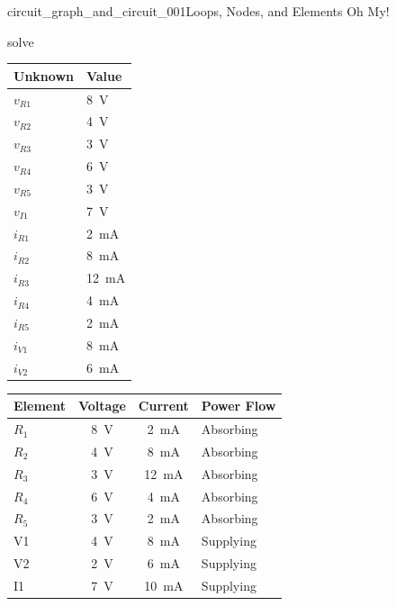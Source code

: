 \begin{mainquestion}{circuit_graph_and_circuit_001}{Loops, Nodes, and Elements Oh My!}
\begin{partquestion}{solve}
\begin{answer}
\begin{table}[htbp]
\begin{minipage}[t]{0.37\textwidth}
\centering
\begin{tabular}{|l|l|}
\hline
Unknown & Value \\ \hline
$v_{R1}$ & \qty{8}{\volt} \\ \hline
$v_{R2}$ & \qty{4}{\volt} \\ \hline
$v_{R3}$ & \qty{3}{\volt} \\ \hline
$v_{R4}$ & \qty{6}{\volt} \\ \hline
$v_{R5}$ & \qty{3}{\volt} \\ \hline
$v_{I1}$ & \qty{7}{\volt} \\ \hline
$i_{R1}$ & \qty{2}{\milli\ampere} \\ \hline
$i_{R2}$ & \qty{8}{\milli\ampere} \\ \hline
$i_{R3}$ & \qty{12}{\milli\ampere} \\ \hline
$i_{R4}$ & \qty{4}{\milli\ampere} \\ \hline
$i_{R5}$ & \qty{2}{\milli\ampere} \\ \hline
$i_{V1}$ & \qty{8}{\milli\ampere} \\ \hline
$i_{V2}$ & \qty{6}{\milli\ampere} \\ \hline
\end{tabular}
\end{minipage}
\hfill
\begin{minipage}[t]{0.60\textwidth}
\centering
\begin{tabular}{|l|c|c|l|}
\hline
Element & Voltage & Current & Power Flow \\ \hline
$R_1$ & \qty{8}{\volt} & \qty{2}{\milli\ampere} & Absorbing \\ \hline
$R_2$ & \qty{4}{\volt} & \qty{8}{\milli\ampere} & Absorbing \\ \hline
$R_3$ & \qty{3}{\volt} & \qty{12}{\milli\ampere} & Absorbing \\ \hline
$R_4$ & \qty{6}{\volt} & \qty{4}{\milli\ampere} & Absorbing \\ \hline
$R_5$ & \qty{3}{\volt} & \qty{2}{\milli\ampere} & Absorbing \\ \hline
V1 & \qty{4}{\volt} & \qty{8}{\milli\ampere} & Supplying \\ \hline
V2 & \qty{2}{\volt} & \qty{6}{\milli\ampere} & Supplying \\ \hline
I1 & \qty{7}{\volt} & \qty{10}{\milli\ampere} & Supplying \\ \hline
\end{tabular}
\end{minipage}


\end{table}
\end{answer}
\end{partquestion}
\end{mainquestion}
